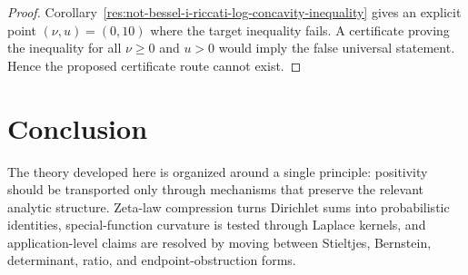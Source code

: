 \documentclass[11pt]{article}
\numberwithin{equation}{section}
\theoremstyle{definition}
\theoremstyle{remark}
\newcommand{\1}{\mathbf 1}
\begin{document}
\begin{proof}
Corollary~\ref{res:not-bessel-i-riccati-log-concavity-inequality} gives an explicit point \((\nu,u)=(0,10)\) where the target inequality fails.  A certificate proving the inequality for all \(\nu\ge0\) and \(u>0\) would imply the false universal statement.  Hence the proposed certificate route cannot exist.
\end{proof}

\section{Conclusion}

The theory developed here is organized around a single principle: positivity
should be transported only through mechanisms that preserve the relevant
analytic structure.  Zeta-law compression turns Dirichlet sums into
probabilistic identities, special-function curvature is tested through
Laplace kernels, and application-level claims are resolved by moving between
Stieltjes, Bernstein, determinant, ratio, and endpoint-obstruction forms.
\end{document}
